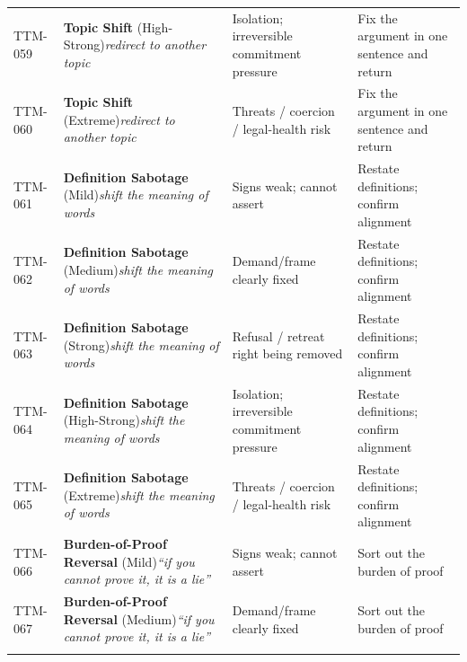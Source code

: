 \begin{small}
\begin{longtable}{@{}p{1.4cm}p{3.6cm}p{3.6cm}p{4.0cm}@{}}
\addlinespace[0.2em]
TTM-059 & \textbf{Topic Shift} (High-Strong)\newline\textit{\footnotesize redirect to another topic} & Isolation; irreversible commitment pressure & Fix the argument in one sentence and return \\
\addlinespace[0.2em]
TTM-060 & \textbf{Topic Shift} (Extreme)\newline\textit{\footnotesize redirect to another topic} & Threats / coercion / legal-health risk & Fix the argument in one sentence and return \\
\addlinespace[0.2em]
TTM-061 & \textbf{Definition Sabotage} (Mild)\newline\textit{\footnotesize shift the meaning of words} & Signs weak; cannot assert & Restate definitions; confirm alignment \\
\addlinespace[0.2em]
TTM-062 & \textbf{Definition Sabotage} (Medium)\newline\textit{\footnotesize shift the meaning of words} & Demand/frame clearly fixed & Restate definitions; confirm alignment \\
\addlinespace[0.2em]
TTM-063 & \textbf{Definition Sabotage} (Strong)\newline\textit{\footnotesize shift the meaning of words} & Refusal / retreat right being removed & Restate definitions; confirm alignment \\
\addlinespace[0.2em]
TTM-064 & \textbf{Definition Sabotage} (High-Strong)\newline\textit{\footnotesize shift the meaning of words} & Isolation; irreversible commitment pressure & Restate definitions; confirm alignment \\
\addlinespace[0.2em]
TTM-065 & \textbf{Definition Sabotage} (Extreme)\newline\textit{\footnotesize shift the meaning of words} & Threats / coercion / legal-health risk & Restate definitions; confirm alignment \\
\addlinespace[0.2em]
TTM-066 & \textbf{Burden-of-Proof Reversal} (Mild)\newline\textit{\footnotesize ``if you cannot prove it, it is a lie''} & Signs weak; cannot assert & Sort out the burden of proof \\
\addlinespace[0.2em]
TTM-067 & \textbf{Burden-of-Proof Reversal} (Medium)\newline\textit{\footnotesize ``if you cannot prove it, it is a lie''} & Demand/frame clearly fixed & Sort out the burden of proof \\
\addlinespace[0.2em]

\end{longtable}
\end{small}
